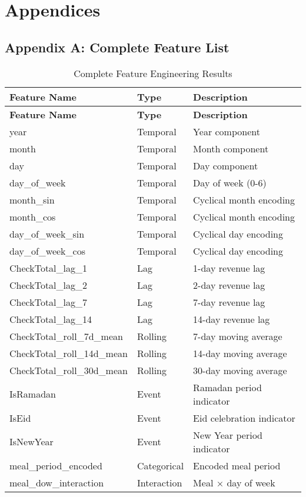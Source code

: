 \documentclass[12pt,a4paper]{article}
\begin{document}
\section{Appendices}

\subsection{Appendix A: Complete Feature List}

\begin{longtable}{@{}lll@{}}
\caption{Complete Feature Engineering Results} \\
\toprule
\textbf{Feature Name} & \textbf{Type} & \textbf{Description} \\
\midrule
\endfirsthead
\toprule
\textbf{Feature Name} & \textbf{Type} & \textbf{Description} \\
\midrule
\endhead
year & Temporal & Year component \\
month & Temporal & Month component \\
day & Temporal & Day component \\
day\_of\_week & Temporal & Day of week (0-6) \\
month\_sin & Temporal & Cyclical month encoding \\
month\_cos & Temporal & Cyclical month encoding \\
day\_of\_week\_sin & Temporal & Cyclical day encoding \\
day\_of\_week\_cos & Temporal & Cyclical day encoding \\
CheckTotal\_lag\_1 & Lag & 1-day revenue lag \\
CheckTotal\_lag\_2 & Lag & 2-day revenue lag \\
CheckTotal\_lag\_7 & Lag & 7-day revenue lag \\
CheckTotal\_lag\_14 & Lag & 14-day revenue lag \\
CheckTotal\_roll\_7d\_mean & Rolling & 7-day moving average \\
CheckTotal\_roll\_14d\_mean & Rolling & 14-day moving average \\
CheckTotal\_roll\_30d\_mean & Rolling & 30-day moving average \\
IsRamadan & Event & Ramadan period indicator \\
IsEid & Event & Eid celebration indicator \\
IsNewYear & Event & New Year period indicator \\
meal\_period\_encoded & Categorical & Encoded meal period \\
meal\_dow\_interaction & Interaction & Meal × day of week \\
\bottomrule
\end{longtable}
\end{document}
